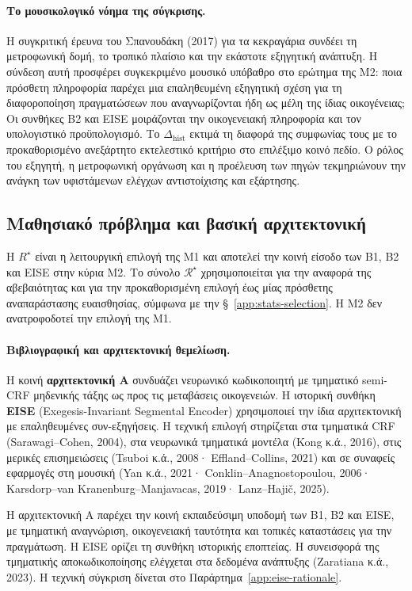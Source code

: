 \documentclass[11pt,a4paper]{article}
\begin{document}
\paragraph{Το μουσικολογικό νόημα της σύγκρισης.} Η συγκριτική έρευνα του Σπανουδάκη (2017) για τα κεκραγάρια συνδέει τη μετροφωνική δομή, το τροπικό πλαίσιο και την εκάστοτε εξηγητική ανάπτυξη. Η σύνδεση αυτή προσφέρει συγκεκριμένο μουσικό υπόβαθρο στο ερώτημα της M2: ποια πρόσθετη πληροφορία παρέχει μια επαληθευμένη εξηγητική σχέση για τη διαφοροποίηση πραγματώσεων που αναγνωρίζονται ήδη ως μέλη της ίδιας οικογένειας; Οι συνθήκες B2 και EISE μοιράζονται την οικογενειακή πληροφορία και τον υπολογιστικό προϋπολογισμό. Το $\Delta_{\mathrm{hist}}$ εκτιμά τη διαφορά της συμφωνίας τους με το προκαθορισμένο ανεξάρτητο εκτελεστικό κριτήριο στο επιλέξιμο κοινό πεδίο. Ο ρόλος του εξηγητή, η μετροφωνική οργάνωση και η προέλευση των πηγών τεκμηριώνουν την ανάγκη των υφιστάμενων ελέγχων αντιστοίχισης και εξάρτησης.

\subsection{Μαθησιακό πρόβλημα και βασική αρχιτεκτονική}

Η $R^\star$ είναι η λειτουργική επιλογή της M1 και αποτελεί την κοινή είσοδο των B1, B2 και EISE στην κύρια M2. Το σύνολο $\mathcal R^\star$ χρησιμοποιείται για την αναφορά της αβεβαιότητας και για την προκαθορισμένη επιλογή έως μίας πρόσθετης αναπαράστασης ευαισθησίας, σύμφωνα με την §~\ref{app:stats-selection}. Η M2 δεν ανατροφοδοτεί την επιλογή της M1.

\paragraph{Βιβλιογραφική και αρχιτεκτονική θεμελίωση.}
Η κοινή \textbf{αρχιτεκτονική A} συνδυάζει νευρωνικό κωδικοποιητή με τμηματικό semi-CRF μηδενικής τάξης ως προς τις μεταβάσεις οικογενειών. Η ιστορική συνθήκη \textbf{EISE} (Exegesis-Invariant Segmental Encoder) χρησιμοποιεί την ίδια αρχιτεκτονική με επαληθευμένες συν-εξηγήσεις. Η τεχνική επιλογή στηρίζεται στα τμηματικά CRF (Sarawagi--Cohen, 2004), στα νευρωνικά τμηματικά μοντέλα (Kong κ.ά., 2016), στις μερικές επισημειώσεις (Tsuboi κ.ά., 2008· Effland--Collins, 2021) και σε συναφείς εφαρμογές στη μουσική (Yan κ.ά., 2021· Conklin--Anagnostopoulou, 2006· Karsdorp--van Kranenburg--Manjavacas, 2019· Lanz--Hajič, 2025).

Η αρχιτεκτονική A παρέχει την κοινή εκπαιδεύσιμη υποδομή των B1, B2 και EISE, με τμηματική αναγνώριση, οικογενειακή ταυτότητα και τοπικές καταστάσεις για την πραγμάτωση. Η EISE ορίζει τη συνθήκη ιστορικής εποπτείας. Η συνεισφορά της τμηματικής αποκωδικοποίησης ελέγχεται στα δεδομένα ανάπτυξης (Zaratiana κ.ά., 2023). Η τεχνική σύγκριση δίνεται στο Παράρτημα~\ref{app:eise-rationale}.
\end{document}

